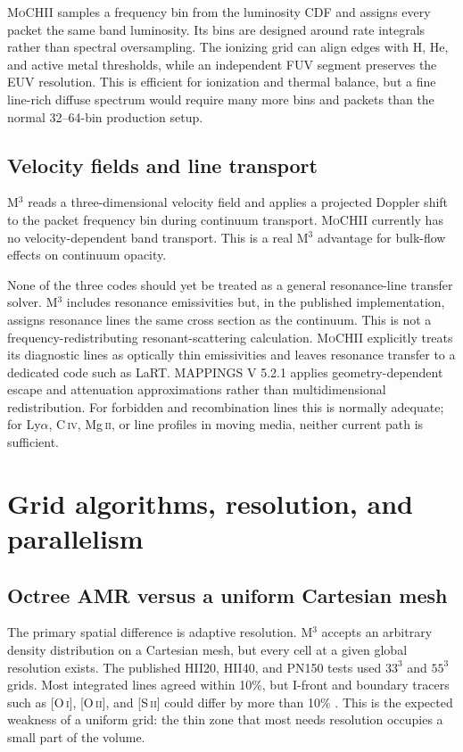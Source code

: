 \documentclass[english,a4paper]{my_memo}
\newcommand{\MoCHII}{\textsc{MoCHII}}
\newcommand{\Mthree}{M$^3$}
\newcommand{\Mappings}{MAPPINGS V 5.2.1}
\begin{document}
\MoCHII{} samples a frequency bin from the luminosity CDF and assigns every
packet the same band luminosity.  Its bins are designed around rate
integrals rather than spectral oversampling.  The ionizing grid can align
edges with H, He, and active metal thresholds, while an independent FUV
segment preserves the EUV resolution.  This is efficient for ionization
and thermal balance, but a fine line-rich diffuse spectrum would require
many more bins and packets than the normal 32--64-bin production setup.

\subsection{Velocity fields and line transport}

\Mthree{} reads a three-dimensional velocity field and applies a projected
Doppler shift to the packet frequency bin during continuum transport.
\MoCHII{} currently has no velocity-dependent band transport.  This is a
real \Mthree{} advantage for bulk-flow effects on continuum opacity.

None of the three codes should yet be treated as a general resonance-line transfer
solver.  \Mthree{} includes resonance emissivities but, in the published
implementation, assigns resonance lines the same cross section as the
continuum.  This is not a frequency-redistributing resonant-scattering
calculation.  \MoCHII{} explicitly treats its diagnostic lines as optically
thin emissivities and leaves resonance transfer to a dedicated code such
as LaRT.  \Mappings{} applies geometry-dependent escape and attenuation
approximations rather than multidimensional redistribution.  For forbidden
and recombination lines this is normally adequate;
for Ly$\alpha$, C\,\textsc{iv}, Mg\,\textsc{ii}, or line profiles in moving
media, neither current path is sufficient.

\section{Grid algorithms, resolution, and parallelism}

\subsection{Octree AMR versus a uniform Cartesian mesh}

The primary spatial difference is adaptive resolution.  \Mthree{} accepts
an arbitrary density distribution on a Cartesian mesh, but every cell at a
given global resolution exists.  The published HII20, HII40, and PN150
tests used $33^3$ and $55^3$ grids.  Most integrated lines agreed within
10\%, but I-front and boundary tracers such as [O\,\textsc{i}],
[O\,\textsc{ii}], and [S\,\textsc{ii}] could differ by more than 10\%
\cite{jin2022}.  This is the expected weakness of a uniform grid: the
thin zone that most needs resolution occupies a small part of the volume.
\end{document}
